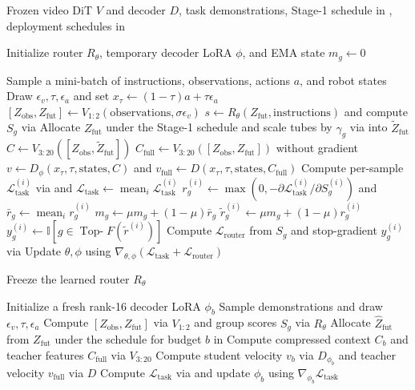 \begin{algorithm}[t]
  \caption{Two-stage training of \method on mimic-video.}
  \label{alg:supp_train}
  \footnotesize
  \begin{algorithmic}[1]
    \Require Frozen video DiT $V$ and decoder $D$, task demonstrations, Stage-1 schedule in , deployment schedules in 

    \State Initialize router $R_\theta$, temporary decoder LoRA $\phi$, and EMA state $m_g \gets 0$

     
      \State Sample a mini-batch of instructions, observations, actions $a$, and robot states
      \State Draw $\epsilon_v, \tau, \epsilon_a$ and set $x_\tau \gets (1-\tau)a + \tau\epsilon_a$
      \State $[Z_{\text{obs}}, Z_{\text{fut}}] \gets V_{1:2}(\text{observations}, \sigma\epsilon_v)$
      \State $s \gets R_\theta(Z_{\text{fut}}, \text{instructions})$ and compute $S_g$ via 
      \State Allocate $Z_{\text{fut}}$ under the Stage-1 schedule and scale tubes by $\gamma_g$ via  into $\tilde{Z}_{\text{fut}}$
      \State $C \gets V_{3:20}([Z_{\text{obs}}, \tilde{Z}_{\text{fut}}])$
      \State $C_{\text{full}} \gets V_{3:20}([Z_{\text{obs}}, Z_{\text{fut}}])$ without gradient
      \State $v \gets D_\phi(x_\tau, \tau, \text{states}, C)$ and $v_{\text{full}} \gets D(x_\tau, \tau, \text{states}, C_{\text{full}})$
      \State Compute per-sample $\mathcal{L}_{\text{task}}^{(i)}$ via  and $\mathcal{L}_{\text{task}} \gets \operatorname{mean}_i \mathcal{L}_{\text{task}}^{(i)}$
      \State $r_g^{(i)} \gets \max(0, -\partial\mathcal{L}_{\text{task}}^{(i)} / \partial S_g^{(i)})$ and $\bar{r}_g \gets \operatorname{mean}_i r_g^{(i)}$
      \State $m_g \gets \mu m_g + (1-\mu)\bar{r}_g$ 
      \State $\tilde{r}_g^{(i)} \gets \mu m_g + (1-\mu)r_g^{(i)}$
      \State $y_g^{(i)} \gets \mathbb{I}[g \in \operatorname{Top-}F(\tilde{r}^{(i)})]$
      \State Compute $\mathcal{L}_{\text{router}}$ from $S_g$ and stop-gradient $y_g^{(i)}$ via 
      \State Update $\theta, \phi$ using $\nabla_{\theta,\phi}(\mathcal{L}_{\text{task}} + \mathcal{L}_{\text{router}})$
    \EndFor

    \State Freeze the learned router $R_\theta$

     
      \State Initialize a fresh rank-16 decoder LoRA $\phi_b$
        \State Sample demonstrations and draw $\epsilon_v, \tau, \epsilon_a$
        \State Compute $[Z_{\text{obs}}, Z_{\text{fut}}]$ via $V_{1:2}$ and group scores $S_g$ via $R_\theta$
        \State Allocate $\hat{Z}_{\text{fut}}$ from $Z_{\text{fut}}$ under the schedule for budget $b$ in 
        \State Compute compressed context $C_b$ and teacher features $C_{\text{full}}$ via $V_{3:20}$
        \State Compute student velocity $v_b$ via $D_{\phi_b}$ and teacher velocity $v_{\text{full}}$ via $D$
        \State Compute $\mathcal{L}_{\text{task}}$ via  and update $\phi_b$ using $\nabla_{\phi_b}\mathcal{L}_{\text{task}}$
      \EndFor
    \EndFor


\end{algorithmic}
\end{algorithm}
